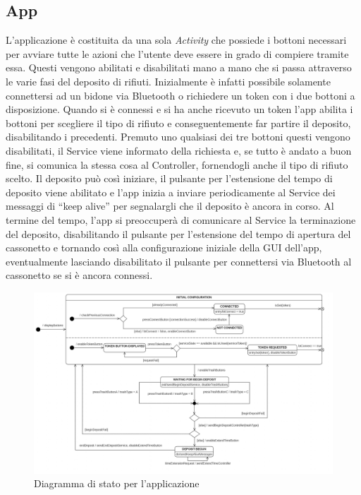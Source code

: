 \documentclass[a4paper, 12pt]{report}
\begin{document}
			\subsection{App}
			L'applicazione è costituita da una sola \emph{Activity} che possiede i bottoni necessari per
			avviare tutte le azioni che l'utente deve essere in grado di compiere tramite essa. Questi vengono abilitati e
			disabilitati mano a mano che si passa attraverso le varie fasi del deposito di rifiuti.
			Inizialmente è infatti possibile solamente connettersi ad un bidone via Bluetooth o
			richiedere un token con i due bottoni a disposizione. Quando si è connessi e si ha anche
			ricevuto un token l'app abilita i bottoni per scegliere il tipo di rifiuto e
			conseguentemente far partire il deposito, disabilitando i precedenti. Premuto uno qualsiasi
			dei tre bottoni questi vengono disabilitati, il Service viene informato della
			richiesta e, se tutto è andato a buon fine, si comunica la stessa cosa al Controller,
			fornendogli anche il tipo di rifiuto scelto. Il deposito può così iniziare, il pulsante 
			per l'estensione del tempo di deposito  viene abilitato e l'app inizia a inviare periodicamente 
			al Service dei messaggi di ``keep alive'' per segnalargli che il deposito è ancora in corso. Al termine del tempo, l'app 
			si preoccuperà di comunicare al Service la terminazione del deposito, disabilitando il pulsante 
			per l'estensione del tempo di apertura del cassonetto e tornando così alla configurazione iniziale 
			della GUI dell'app, eventualmente lasciando disabilitato il pulsante per connettersi via Bluetooth 
			al cassonetto se si è ancora connessi.
			\begin{figure}[H]
				\centering
				\includegraphics[width=1.03\textwidth]{"img/AppStatechart"}    
				\caption{Diagramma di stato per l'applicazione}
			\end{figure}
\end{document}
